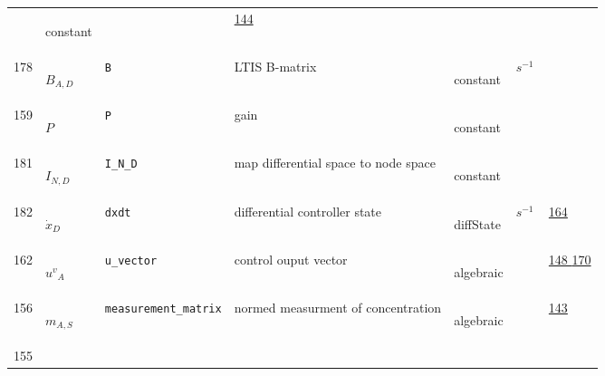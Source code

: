\begin{longtable}{|p{1cm}|p{2.5cm}|p{4.5cm}|p{8cm}|p{3.0cm}|p{3cm}|p{1cm}|}
             & \begin{lay}constant \end{lay}
             & $  $
             &                 \hyperlink{"e:144"}{ 144 }
                 \\
            178
             & \hypertarget{"v:178"}{ $ {B}{_{A, D}} $}
             & \verb|B|
             & LTIS B-matrix
             & \begin{lay}constant \end{lay}
             & $ s^{-1} \, $
             & \\
            159
             & \hypertarget{"v:159"}{ $ {P}{_{}} $}
             & \verb|P|
             & gain
             & \begin{lay}constant \end{lay}
             & $  $
             & \\
            181
             & \hypertarget{"v:181"}{ $ {I}{_{N, D}} $}
             & \verb|I_N_D|
             & map differential space to node space
             & \begin{lay}constant \end{lay}
             & $  $
             & \\
            182
             & \hypertarget{"v:182"}{ $ {{\dot{x}}}{_{D}} $}
             & \verb|dxdt|
             & differential controller state
             & \begin{lay}diffState \end{lay}
             & $ s^{-1} \, $
             &                 \hyperlink{"e:164"}{ 164 }
                 \\
            162
             & \hypertarget{"v:162"}{ $ {{u^{v}}}{_{A}} $}
             & \verb|u_vector|
             & control ouput vector
             & \begin{lay}algebraic \end{lay}
             & $  $
             &                 \hyperlink{"e:148"}{ 148 }
                                 \hyperlink{"e:170"}{ 170 }
                 \\
            156
             & \hypertarget{"v:156"}{ $ {m}{_{A, S}} $}
             & \verb|measurement_matrix|
             & normed measurment of concentration
             & \begin{lay}algebraic \end{lay}
             & $  $
             &                 \hyperlink{"e:143"}{ 143 }
                 \\
            155

\end{longtable}
